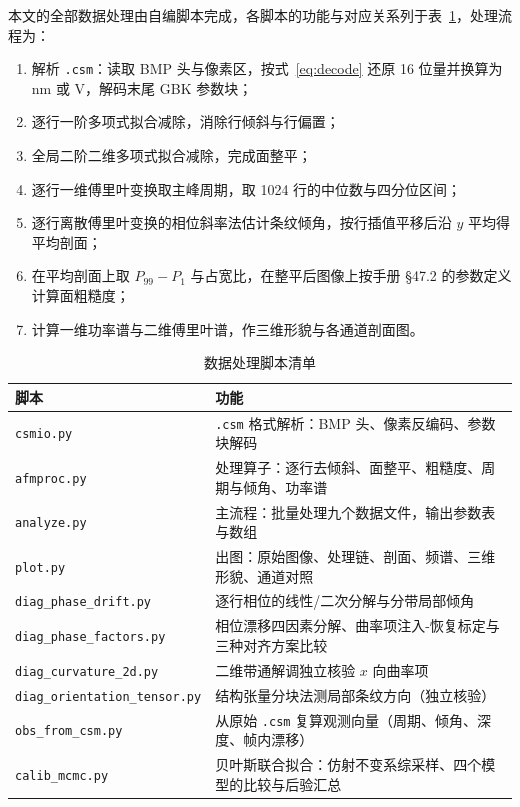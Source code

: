 \documentclass[12pt,a4paper,fontset=windows]{ctexart}
\begin{document}
本文的全部数据处理由自编脚本完成，各脚本的功能与对应关系列于表~\ref{tab:code}，处理流程为：

\begin{enumerate}
  \item 解析 \texttt{.csm}：读取 BMP 头与像素区，按式~\eqref{eq:decode} 还原 16 位量并换算为 nm 或 V，解码末尾 GBK 参数块；
  \item 逐行一阶多项式拟合减除，消除行倾斜与行偏置；
  \item 全局二阶二维多项式拟合减除，完成面整平；
  \item 逐行一维傅里叶变换取主峰周期，取 1024 行的中位数与四分位区间；
  \item 逐行离散傅里叶变换的相位斜率法估计条纹倾角，按行插值平移后沿 $y$ 平均得平均剖面；
  \item 在平均剖面上取 $P_{99}-P_1$ 与占宽比，在整平后图像上按手册 §47.2 的参数定义计算面粗糙度；
  \item 计算一维功率谱与二维傅里叶谱，作三维形貌与各通道剖面图。
\end{enumerate}

\begin{table}[H]
\centering
\caption{数据处理脚本清单}
\label{tab:code}
\small
{}
\begin{tabularx}{\textwidth}{@{}lX@{}}
\toprule
脚本 & 功能 \\
\midrule
\texttt{csmio.py} & \texttt{.csm} 格式解析：BMP 头、像素反编码、参数块解码 \\
\texttt{afmproc.py} & 处理算子：逐行去倾斜、面整平、粗糙度、周期与倾角、功率谱 \\
\texttt{analyze.py} & 主流程：批量处理九个数据文件，输出参数表与数组 \\
\texttt{plot.py} & 出图：原始图像、处理链、剖面、频谱、三维形貌、通道对照 \\
\texttt{diag\_phase\_drift.py} & 逐行相位的线性/二次分解与分带局部倾角 \\
\texttt{diag\_phase\_factors.py} & 相位漂移四因素分解、曲率项注入-恢复标定与三种对齐方案比较 \\
\texttt{diag\_curvature\_2d.py} & 二维带通解调独立核验 $x$ 向曲率项 \\
\texttt{diag\_orientation\_tensor.py} & 结构张量分块法测局部条纹方向（独立核验）\\
\texttt{obs\_from\_csm.py} & 从原始 \texttt{.csm} 复算观测向量（周期、倾角、深度、帧内漂移）\\
\texttt{calib\_mcmc.py} & 贝叶斯联合拟合：仿射不变系综采样、四个模型的比较与后验汇总 \\
\bottomrule
\end{tabularx}
\end{table}
\end{document}
